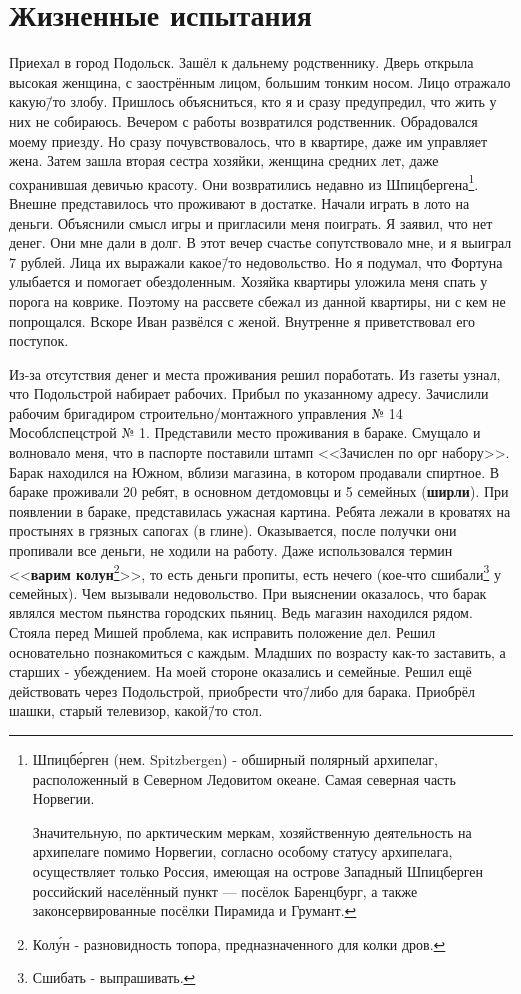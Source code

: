 ﻿\chapter{Жизненные испытания}

Приехал в город Подольск. Зашёл к дальнему родственнику. Дверь открыла высокая женщина, с заострённым лицом, большим тонким носом. Лицо отражало какую\=/то злобу. Пришлось объясниться, кто я и сразу предупредил, что жить у них не собираюсь. Вечером с работы возвратился родственник. Обрадовался моему приезду. Но сразу почувствовалось, что в квартире, даже им управляет жена. Затем зашла вторая сестра хозяйки, женщина средних лет, даже сохранившая девичью красоту. Они возвратились недавно из Шпицбергена\footnote{Шпицб\'{е}рген (нем. Spitzbergen) - обширный полярный архипелаг, расположенный в Северном Ледовитом океане. Самая северная часть Норвегии. 

Значительную, по арктическим меркам, хозяйственную деятельность на архипелаге помимо Норвегии, согласно особому статусу архипелага, осуществляет только Россия, имеющая на острове Западный Шпицберген российский населённый пункт — посёлок Баренцбург, а также законсервированные посёлки Пирамида и Грумант.}. 
Внешне представилось что проживают в достатке. Начали играть в лото на деньги. Объяснили смысл игры и пригласили меня поиграть. Я заявил, что нет денег. Они мне дали в долг. В этот вечер счастье сопутствовало мне, и я выиграл 7 рублей. Лица их выражали какое\=/то недовольство. Но я подумал, что Фортуна улыбается и помогает обездоленным. Хозяйка квартиры уложила меня спать у порога на коврике. Поэтому на рассвете сбежал из данной квартиры, ни с кем не попрощался. Вскоре Иван развёлся с женой. Внутренне я приветствовал его поступок.

Из-за отсутствия денег и места проживания решил поработать. Из газеты узнал, что Подольстрой набирает рабочих. Прибыл по указанному адресу. Зачислили рабочим бригадиром строительно\-/монтажного управления № 14 Мособлспецстрой № 1. Представили место проживания в бараке. Смущало и волновало меня, что в паспорте поставили штамп <<Зачислен по орг набору>>. Барак находился на Южном, вблизи магазина, в котором продавали спиртное. В бараке проживали 20 ребят, в основном детдомовцы и 5 семейных (\textbf{ширли}). При появлении в бараке, представилась ужасная картина. Ребята лежали в кроватях на простынях в грязных сапогах (в глине). Оказывается, после получки они пропивали все деньги, не ходили на работу. Даже использовался термин <<\textbf{варим колун}\footnote{Кол\'{у}н - разновидность топора, предназначенного для колки дров.}>>, то есть деньги пропиты, есть нечего (кое-что сшибали\footnote{Сшибать - выпрашивать.} у семейных). Чем вызывали недовольство. При выяснении оказалось, что барак являлся местом пьянства городских пьяниц. Ведь магазин находился рядом. Стояла перед Мишей проблема, как исправить положение дел. Решил основательно познакомиться с каждым. Младших по возрасту как-то заставить, а старших - убеждением. На моей стороне оказались и семейные. Решил ещё действовать через Подольстрой, приобрести что\=/либо для барака. Приобрёл шашки, старый телевизор, какой\=/то стол.


